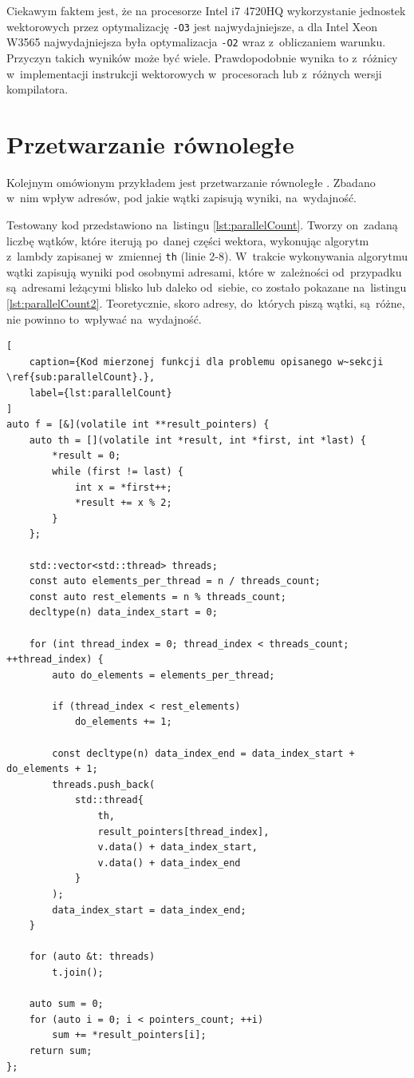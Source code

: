 Ciekawym faktem jest, że na procesorze Intel i7 4720HQ wykorzystanie jednostek wektorowych przez optymalizację \texttt{-O3} jest najwydajniejsze, a dla Intel Xeon W3565 najwydajniejsza była optymalizacja \texttt{-O2} wraz z~obliczaniem warunku.
Przyczyn takich wyników może być wiele. Prawdopodobnie wynika to z~różnicy w~implementacji instrukcji wektorowych w~procesorach lub z~różnych wersji kompilatora.

\section{Przetwarzanie równoległe}
\label{sub:parallelCount}

Kolejnym omówionym przykładem jest przetwarzanie równoległe \cite{MindTheCache_ParallelCount}. Zbadano w~nim wpływ adresów, pod jakie wątki zapisują wyniki, na~wydajność.

Testowany kod przedstawiono na~listingu \ref{lst:parallelCount}. Tworzy on~zadaną liczbę wątków, które iterują po~danej części wektora, wykonując algorytm z~lambdy zapisanej w~zmiennej \texttt{th} (linie 2-8). W~trakcie wykonywania algorytmu wątki zapisują wyniki pod osobnymi adresami, które w~zależności od~przypadku są~adresami leżącymi blisko lub daleko od~siebie, co zostało pokazane na~listingu \ref{lst:parallelCount2}. Teoretycznie, skoro adresy, do~których piszą wątki, są~różne, nie powinno to~wpływać na~wydajność.


\begin{lstlisting}[
    caption={Kod mierzonej funkcji dla problemu opisanego w~sekcji \ref{sub:parallelCount}.},
    label={lst:parallelCount}
]
auto f = [&](volatile int **result_pointers) {
    auto th = [](volatile int *result, int *first, int *last) {
        *result = 0;
        while (first != last) {
            int x = *first++;
            *result += x % 2;
        }
    };
    
    std::vector<std::thread> threads;
    const auto elements_per_thread = n / threads_count;
    const auto rest_elements = n % threads_count;
    decltype(n) data_index_start = 0;
    
    for (int thread_index = 0; thread_index < threads_count; ++thread_index) {
        auto do_elements = elements_per_thread;
        
        if (thread_index < rest_elements)
            do_elements += 1;
        
        const decltype(n) data_index_end = data_index_start + do_elements + 1;
        threads.push_back(
            std::thread{
                th,
                result_pointers[thread_index],
                v.data() + data_index_start,
                v.data() + data_index_end
            }
        );
        data_index_start = data_index_end;
    }
    
    for (auto &t: threads)
        t.join();
    
    auto sum = 0;
    for (auto i = 0; i < pointers_count; ++i)
        sum += *result_pointers[i];
    return sum;
};
\end{lstlisting}

